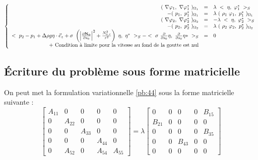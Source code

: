 \documentclass[a4paper]{report}
\begin{document}
\begin{eqnarray}\label{pb:44}
\left\{
\begin{array}{rcl}
(\ \nabla \varphi_1 ,\ \nabla \varphi^*_1 \ )_{\Omega_1} &=& \lambda\ <\ \eta,\ \varphi^*_1 \ >_S \\
- (\ p_1 ,\ p^*_1 \ )_{\Omega_1} &=& \lambda\ (\ \rho_1\ \varphi_1 ,\ p^*_1 \ )_{\Omega_1} \\
(\ \nabla \varphi_2 ,\ \nabla \varphi^*_2 \ )_{\Omega_2} &=& - \lambda\ <\ \eta,\ \varphi^*_2 \ >_S \\
- (\ p_2 ,\ p^*_2 \ )_{\Omega_2} &=& \lambda\ (\ \rho_2\ \varphi_2 ,\ p^*_2 \ )_{\Omega_2} \\
<\ p_2 - p_1 + \Delta{\rho} g \eta \cdot \vec{e}_z + \sigma\ \left( \left| \frac{\partial \bf N_0}{\partial s_0} \right|^2  + \frac{N_{0,r}^2}{r^2} \right) \ \eta ,\ \eta^* \ >_S - <\ \sigma\ \frac{\partial}{\partial s_0} \eta ,\ \frac{\partial}{\partial s_0} \eta* \ >_S &=& 0 \\
\text{+ Condition à limite pour la vitesse au fond de la goutte est nul} 
\end{array}
\right.
\end{eqnarray}
\subsection{Écriture du problème sous forme matricielle}
On peut met la formulation variationnelle \eqref{pb:44} sous la forme matricielle suivante :
\begin{equation}\label{eq:45}
\begin{bmatrix}
A_{11} & 0      & 0      & 0      & 0\\
0      & A_{22} & 0      & 0      & 0\\
0      & 0      & A_{33} & 0      & 0\\
0      & 0      & 0      & A_{44} & 0\\
0      & A_{52} & 0      & A_{54} & A_{55}
\end{bmatrix}
=
\lambda
\begin{bmatrix}
0      & 0 & 0      & 0 & B_{15}\\
B_{21} & 0 & 0      & 0 & 0\\
0      & 0 & 0      & 0 & B_{35}\\
0      & 0 & B_{43} & 0 & 0\\
0      & 0 & 0      & 0 & 0
\end{bmatrix}
\end{equation}
\newpage
\end{document}
